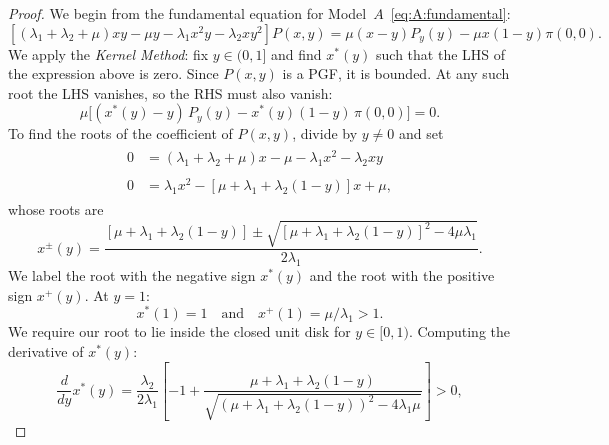 \begin{proof}

    We begin from the fundamental equation for Model~$A$~\eqref{eq:A:fundamental}:
    \begin{equation*}
        \left[ (\lambda_1+\lambda_2+ \mu)xy - \mu y - \lambda_1 x^2y - \lambda_2 xy^2 \right] P(x,y)
        = \mu(x-y) P_y(y)  - \mu x(1-y) \pi(0,0).
    \end{equation*}
    We apply the \emph{Kernel Method}: fix $y\in(0,1]$ and find $x^*(y)$ such that the
    LHS of the expression above is zero. Since $P(x,y)$ is a PGF, it is bounded. At any
    such root the LHS vanishes, so the RHS must also vanish:
    \[
        \mu\bigl[(x^*(y)-y)\,P_y(y) - x^*(y)(1-y)\,\pi(0,0)\bigr] = 0.
    \]
    To find the roots of the coefficient of $P(x,y)$, divide by $y\neq 0$ and set
    \begin{align*}
        \begin{split}
             0 &=  (\lambda_1 + \lambda_2 + \mu)x - \mu  -\lambda_1x^2 - \lambda_2xy
        \end{split} \\
        \begin{split}
          0 &=  \lambda_1 x^2 - \left[ \mu + \lambda_1 + \lambda_2 (1-y) \right] x + \mu,
        \end{split}
    \end{align*}
    whose roots are
    \begin{equation*}
        x^{\pm}(y) = \frac{
            \left[\mu + \lambda_1 + \lambda_2 (1-y) \right] \pm \sqrt{
                \left[\mu + \lambda_1 + \lambda_2 (1-y) \right]^2 - 4  \mu \lambda_1
            }
        }{
            2\lambda_1
        }.
    \end{equation*}
    We label the root with the negative sign $x^*(y)$ and the root with the positive
    sign $x^+(y)$. At $y=1$:
    \begin{equation*}
        x^*(1) = 1 \quad \text{and} \quad x^+(1) = \mu/\lambda_1 > 1.
    \end{equation*}
    We require our root to lie inside the closed unit disk for $y\in[0,1)$. Computing
    the derivative of $x^*(y)$:
    \begin{equation}
        \frac{d}{dy}x^*(y) = \frac{\lambda_2}{2\lambda_1}\!\left[-1+\frac{\mu+\lambda_1+\lambda_2(1-y)}{\sqrt{(\mu+\lambda_1+\lambda_2(1-y))^2-4\lambda_1\mu}}\right]>0,
        \label{eq:A:xstar_prime}
    \end{equation}

\end{proof}
